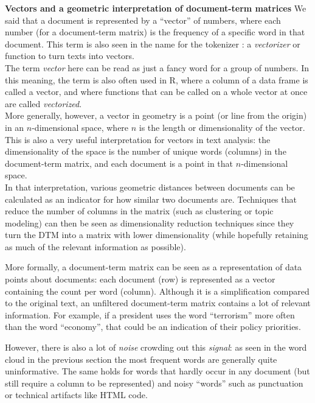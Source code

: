 \begin{feature}
  \textbf{Vectors and a geometric interpretation of document-term matrices}
  We said that a document is represented by a ``vector'' of numbers, where each number (for a document-term matrix)
  is the frequency of a specific word in that document. This term is also seen in the name for the tokenizer \sklearn:
  a \emph{vectorizer} or function to turn texts into vectors. \\%
  The term \emph{vector} here can be read as just a fancy word for a group of numbers.
  In this meaning, the term is also often used in R, where a column of a data frame is called a vector,
  and where functions that can be called on a whole vector at once are called \emph{vectorized}. \\%
  More generally, however, a vector in geometry is a point (or line from the origin) in an $n$-dimensional space,
  where $n$ is the length or dimensionality of the vector.
  This is also a very useful interpretation for vectors in text analysis:
  the dimensionality of the space is the number of unique words (columns) in the document-term matrix,
  and each document is a point in that $n$-dimensional space.\\%
  In that interpretation, various geometric distances between documents can be calculated as an indicator for how similar
  two documents are. Techniques that reduce the number of columns in the matrix (such as clustering or topic modeling)
  can then be seen as dimensionality reduction techniques since they turn the DTM into a matrix with lower dimensionality
  (while hopefully retaining as much of the relevant information as possible).
\end{feature}
\vspace{1em}

More formally, a document-term matrix can be seen as a representation of data points about documents:
each document (row) is represented as a vector containing the count per word (column).
Although it is a simplification compared to the original text,
an unfiltered document-term matrix contains a lot of relevant information.
For example, if a president uses the word ``terrorism'' more often than the word ``economy'', that could be an indication of their policy priorities.

However, there is also a lot of \emph{noise} crowding out this \emph{signal}:
as seen in the word cloud in the previous section the most frequent words are generally quite uninformative.
The same holds for words that hardly occur in any document (but still require a column to be represented)
and noisy ``words'' such as punctuation or technical artifacts like HTML code.

